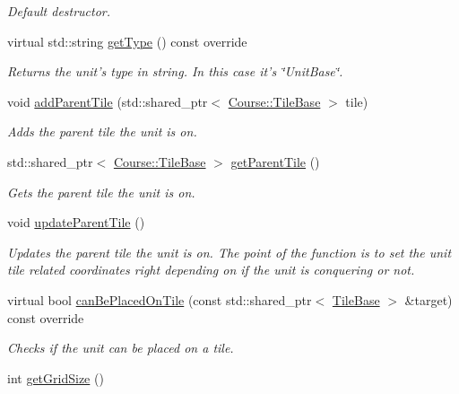 \begin{DoxyCompactItemize}
\begin{DoxyCompactList}\small\item\em Default destructor. \end{DoxyCompactList}\item 
virtual std\-::string \hyperlink{class_course_1_1_unit_base_a5b7353afcd94aa5ad3670ac652fd8ca2}{get\-Type} () const override
\begin{DoxyCompactList}\small\item\em Returns the unit's type in string. In this case it's \char`\"{}\-Unit\-Base\char`\"{}. \end{DoxyCompactList}\item 
void \hyperlink{class_course_1_1_unit_base_a51f0564112ada7a9d2700ecb04d0d309}{add\-Parent\-Tile} (std\-::shared\-\_\-ptr$<$ \hyperlink{class_course_1_1_tile_base}{Course\-::\-Tile\-Base} $>$ tile)
\begin{DoxyCompactList}\small\item\em Adds the parent tile the unit is on. \end{DoxyCompactList}\item 
std\-::shared\-\_\-ptr$<$ \hyperlink{class_course_1_1_tile_base}{Course\-::\-Tile\-Base} $>$ \hyperlink{class_course_1_1_unit_base_a49024d8ba68370f6f828bd22cf04d8df}{get\-Parent\-Tile} ()
\begin{DoxyCompactList}\small\item\em Gets the parent tile the unit is on. \end{DoxyCompactList}\item 
void \hyperlink{class_course_1_1_unit_base_a67af30f42c5839524bc4dbd071384a39}{update\-Parent\-Tile} ()
\begin{DoxyCompactList}\small\item\em Updates the parent tile the unit is on. The point of the function is to set the unit tile related coordinates right depending on if the unit is conquering or not. \end{DoxyCompactList}\item 
virtual bool \hyperlink{class_course_1_1_unit_base_a67d35d8bde94d778bbbf611d2d7d6562}{can\-Be\-Placed\-On\-Tile} (const std\-::shared\-\_\-ptr$<$ \hyperlink{class_course_1_1_tile_base}{Tile\-Base} $>$ \&target) const override
\begin{DoxyCompactList}\small\item\em Checks if the unit can be placed on a tile. \end{DoxyCompactList}\item 
int \hyperlink{class_course_1_1_unit_base_aad5b491a13617446e34f34118cd920ef}{get\-Grid\-Size} ()

\end{DoxyCompactItemize}
